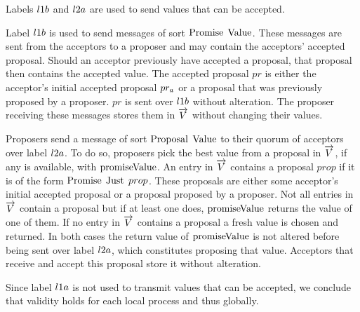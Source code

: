 Labels $l1b$ and $l2a$ are used to send values that can be accepted.

Label $l1b$ is used to send messages of sort $\operatorname{Promise}\; \operatorname{Value}$.
These messages are sent from the acceptors to a proposer and may contain the acceptors' accepted proposal.
Should an acceptor previously have accepted a proposal, that proposal then contains the accepted value.
The accepted proposal $pr$ is either the acceptor's initial accepted proposal $pr_{a}$ or a proposal that was previously proposed by a proposer.
$pr$ is sent over $l1b$ without alteration.
The proposer receiving these messages stores them in $\overrightarrow{V}$ without changing their values.

Proposers send a message of sort $\operatorname{Proposal}\; \operatorname{Value}$ to their quorum of acceptors over label $l2a$.
To do so, proposers pick the best value from a proposal in $\overrightarrow{V}$, if any is available, with $\operatorname{promiseValue}$.
An entry in $\overrightarrow{V}$ contains a proposal $prop$ if it is of the form $\operatorname{Promise}\; \operatorname{Just}\; prop$.
These proposals are either some acceptor's initial accepted proposal or a proposal proposed by a proposer.
Not all entries in $\overrightarrow{V}$ contain a proposal but if at least one does, $\operatorname{promiseValue}$ returns the value of one of them.
If no entry in $\overrightarrow{V}$ contains a proposal a fresh value is chosen and returned.
In both cases the return value of $\operatorname{promiseValue}$ is not altered before being sent over label $l2a$, which constitutes proposing that value.
Acceptors that receive and accept this proposal store it without alteration.

Since label $l1a$ is not used to transmit values that can be accepted, we conclude that validity holds for each local process and thus globally.
